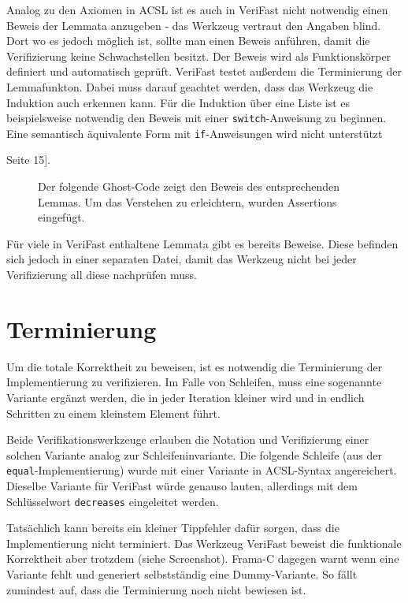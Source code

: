Analog zu den Axiomen in ACSL ist es auch in VeriFast nicht notwendig einen Beweis der Lemmata anzugeben -
das Werkzeug vertraut den Angaben blind. Dort wo es jedoch möglich ist, sollte man einen Beweis anführen,
damit die Verifizierung keine Schwachstellen besitzt.
Der Beweis wird als Funktionskörper definiert und automatisch geprüft. VeriFast testet außerdem die
Terminierung der Lemmafunkton. 
Dabei muss darauf geachtet werden, dass das Werkzeug die Induktion auch 
erkennen kann. Für die Induktion über eine Liste ist es beispielsweise notwendig den Beweis mit einer 
\texttt{switch}-Anweisung zu beginnen. Eine semantisch äquivalente Form mit \texttt{if}-Anweisungen wird 
nicht unterstützt\cite{jacobs-tutorial}{Seite 15].
\begin{figure}[H]
Der folgende Ghost-Code zeigt den Beweis des entsprechenden Lemmas. Um das Verstehen zu erleichtern,
wurden Assertions eingefügt.

\end{figure} 
Für viele in VeriFast enthaltene Lemmata gibt es bereits Beweise. Diese befinden sich jedoch in einer separaten
Datei, damit das Werkzeug nicht bei jeder Verifizierung all diese nachprüfen muss.

\section{Terminierung}

Um die totale Korrektheit zu beweisen, ist es notwendig die Terminierung der Implementierung zu
verifizieren. Im Falle von Schleifen, muss eine sogenannte Variante ergänzt werden, die
in jeder Iteration kleiner wird und in endlich Schritten zu einem kleinstem Element führt.

Beide Verifikationswerkzeuge erlauben die Notation und Verifizierung einer solchen Variante analog zur
Schleifeninvariante. Die folgende Schleife (aus der \texttt{equal}-Implementierung) wurde mit einer Variante 
in ACSL-Syntax angereichert. Dieselbe Variante für VeriFast würde genauso lauten, allerdings
mit dem Schlüsselwort \texttt{decreases} eingeleitet werden.
\begin{figure}[H]

\end{figure}

Tatsächlich kann bereits ein kleiner Tippfehler dafür sorgen, dass die Implementierung
nicht terminiert. Das Werkzeug VeriFast beweist die funktionale Korrektheit aber trotzdem
(siehe Screenshot). Frama-C dagegen warnt wenn eine Variante fehlt und generiert selbstständig
eine Dummy-Variante. So fällt zumindest auf, dass die Terminierung noch nicht bewiesen ist.

}
